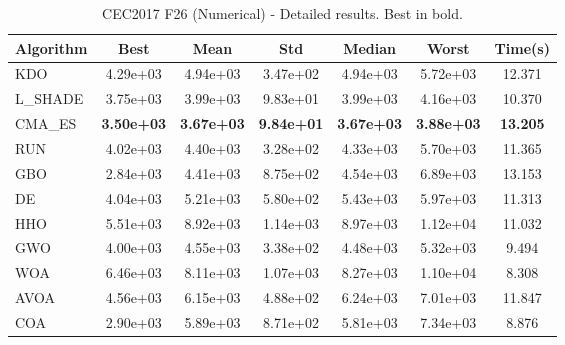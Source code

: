 \begin{table}[H]
\centering\small
\caption{CEC2017 F26 (Numerical) - Detailed results. Best in bold.}
\label{tab:cec2017_F26}
\begin{tabular}{lcccccc}
\toprule
\textbf{Algorithm} & \textbf{Best} & \textbf{Mean} & \textbf{Std} & \textbf{Median} & \textbf{Worst} & \textbf{Time(s)} \\
\midrule
KDO & 4.29e+03 & 4.94e+03 & 3.47e+02 & 4.94e+03 & 5.72e+03 & 12.371 \\
L_SHADE & 3.75e+03 & 3.99e+03 & 9.83e+01 & 3.99e+03 & 4.16e+03 & 10.370 \\
CMA_ES & \textbf{3.50e+03} & \textbf{3.67e+03} & \textbf{9.84e+01} & \textbf{3.67e+03} & \textbf{3.88e+03} & \textbf{13.205} \\
RUN & 4.02e+03 & 4.40e+03 & 3.28e+02 & 4.33e+03 & 5.70e+03 & 11.365 \\
GBO & 2.84e+03 & 4.41e+03 & 8.75e+02 & 4.54e+03 & 6.89e+03 & 13.153 \\
DE & 4.04e+03 & 5.21e+03 & 5.80e+02 & 5.43e+03 & 5.97e+03 & 11.313 \\
HHO & 5.51e+03 & 8.92e+03 & 1.14e+03 & 8.97e+03 & 1.12e+04 & 11.032 \\
GWO & 4.00e+03 & 4.55e+03 & 3.38e+02 & 4.48e+03 & 5.32e+03 & 9.494 \\
WOA & 6.46e+03 & 8.11e+03 & 1.07e+03 & 8.27e+03 & 1.10e+04 & 8.308 \\
AVOA & 4.56e+03 & 6.15e+03 & 4.88e+02 & 6.24e+03 & 7.01e+03 & 11.847 \\
COA & 2.90e+03 & 5.89e+03 & 8.71e+02 & 5.81e+03 & 7.34e+03 & 8.876 \\
\bottomrule
\end{tabular}
\end{table}

